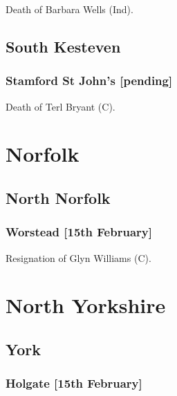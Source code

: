 \documentclass[a4paper,openany]{book}
\begin{document}
\begin{resultsiii}

Death of Barbara Wells (Ind).

\subsection*{South Kesteven}

\subsubsection*{Stamford St John's \hspace*{\fill}\nolinebreak[1]%
\enspace\hspace*{\fill}
[pending]}


Death of Terl Bryant (C).

\section{Norfolk}

\subsection*{North Norfolk}

\subsubsection*{Worstead \hspace*{\fill}\nolinebreak[1]%
\enspace\hspace*{\fill}
[15th February]}


Resignation of Glyn Williams (C).

\section{North Yorkshire}

\subsection*{York}

\subsubsection*{Holgate \hspace*{\fill}\nolinebreak[1]%
\enspace\hspace*{\fill}
[15th February]}


\end{resultsiii}
\end{document}
